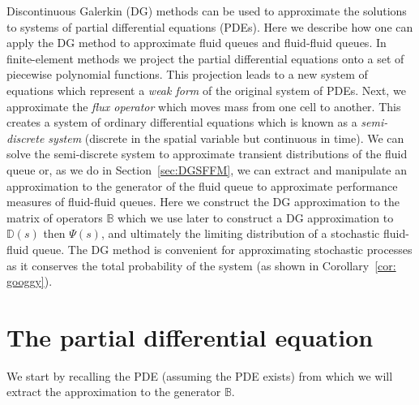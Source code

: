 Discontinuous Galerkin (DG) methods can be used to approximate the solutions to systems of partial differential equations (PDEs). Here we describe how one can apply the DG method to approximate fluid queues and fluid-fluid queues. In finite-element methods we project the partial differential equations onto a set of piecewise polynomial functions. This projection leads to a new system of equations which represent a \textit{weak form} of the original system of PDEs. Next, we approximate the \textit{flux operator} which moves mass from one cell to another. This creates a system of ordinary differential equations which is known as a \emph{semi-discrete system} (discrete in the spatial variable but continuous in time). We can solve the semi-discrete system to approximate transient distributions of the fluid queue or, as we do in Section~\ref{sec:DGSFFM}, we can extract and manipulate an approximation to the generator of the fluid queue to approximate performance measures of fluid-fluid queues. Here we construct the DG approximation to the matrix of operators \(\mathbb B\) which we use later to construct a DG approximation to \(\mathbb D(s)\) then \(\mathbb\Psi(s)\), and ultimately the limiting distribution of a stochastic fluid-fluid queue. The DG method is convenient for approximating stochastic processes as it conserves the total probability of the system (as shown in Corollary~\ref{cor: googgy}).

\section{The partial differential equation}
We start by recalling the PDE (assuming the PDE exists) from which we will extract the approximation to the generator \(\mathbb B\). 

